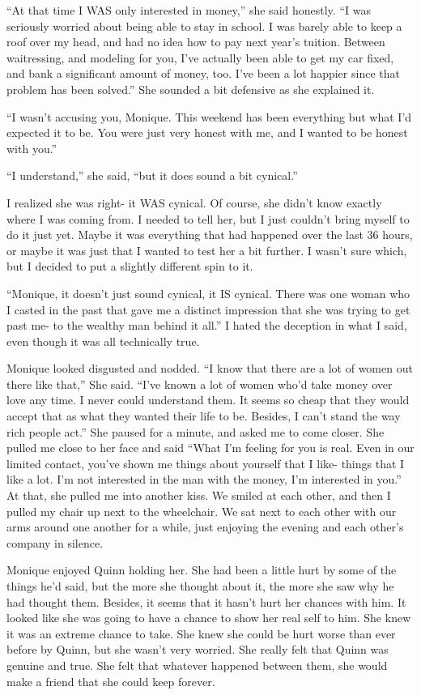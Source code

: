 ``At that time I WAS only interested in money,'' she said honestly. ``I was seriously
worried about being able to stay in school. I was barely able to keep a roof over my head, and
had no idea how to pay next year's tuition. Between waitressing, and modeling for you, I've
actually been able to get my car fixed, and bank a significant amount of money, too. I've been a
lot happier since that problem has been solved.'' She sounded a bit defensive as she explained
it.

``I wasn't accusing you, Monique. This weekend has been everything but what I'd expected
it to be. You were just very honest with me, and I wanted to be honest with you.''

``I understand,'' she said, ``but it does sound a bit cynical.''

I realized she was right- it WAS cynical. Of course, she didn't know exactly where I was
coming from. I needed to tell her, but I just couldn't bring myself to do it just yet. Maybe it
was everything that had happened over the last 36 hours, or maybe it was just that I wanted to
test her a bit further. I wasn't sure which, but I decided to put a slightly different spin to
it.

``Monique, it doesn't just sound cynical, it IS cynical. There was one woman who I casted
in the past that gave me a distinct impression that she was trying to get past me- to the
wealthy man behind it all.'' I hated the deception in what I said, even though it was all
technically true.

Monique looked disgusted and nodded. ``I know that there are a lot of women out there like
that,'' She said. ``I've known a lot of women who'd take money over love any time. I never could
understand them. It seems so cheap that they would accept that as what they wanted their life to
be. Besides, I can't stand the way rich people act.'' She paused for a minute, and asked me to
come closer. She pulled me close to her face and said ``What I'm feeling for you is real. Even
in our limited contact, you've shown me things about yourself that I like- things that I like a
lot. I'm not interested in the man with the money, I'm interested in you.'' At that, she pulled
me into another kiss. We smiled at each other, and then I pulled my chair up next to the
wheelchair. We sat next to each other with our arms around one another for a while, just
enjoying the evening and each other's company in silence.

\begin{thought}
Monique enjoyed Quinn holding her. She had been a little hurt by some of the things he'd
said, but the more she thought about it, the more she saw why he had thought them. Besides, it
seems that it hasn't hurt her chances with him. It looked like she was going to have a chance to
show her real self to him. She knew it was an extreme chance to take. She knew she could be hurt
worse than ever before by Quinn, but she wasn't very worried. She really felt that Quinn was
genuine and true. She felt that whatever happened between them, she would make a friend that she
could keep forever.
\end{thought}

